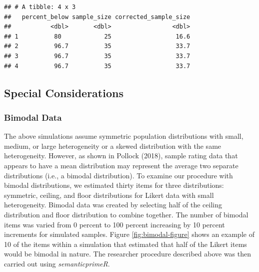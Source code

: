\documentclass[
  man]{apa7}
\newenvironment{Shaded}{\begin{snugshade}}{\end{snugshade}}
\newcommand{\AttributeTok}[1]{\textcolor[rgb]{0.13,0.29,0.53}{#1}}
\newcommand{\CommentTok}[1]{\textcolor[rgb]{0.56,0.35,0.01}{\textit{#1}}}
\newcommand{\DecValTok}[1]{\textcolor[rgb]{0.00,0.00,0.81}{#1}}
\newcommand{\FunctionTok}[1]{\textcolor[rgb]{0.13,0.29,0.53}{\textbf{#1}}}
\newcommand{\NormalTok}[1]{#1}
\newcommand{\OtherTok}[1]{\textcolor[rgb]{0.56,0.35,0.01}{#1}}
\newcommand{\SpecialCharTok}[1]{\textcolor[rgb]{0.81,0.36,0.00}{\textbf{#1}}}
\begin{document}
\begin{Shaded}
\end{Shaded}

\begin{verbatim}
## # A tibble: 4 x 3
##   percent_below sample_size corrected_sample_size
##           <dbl>       <dbl>                 <dbl>
## 1          80            25                  16.6
## 2          96.7          35                  33.7
## 3          96.7          35                  33.7
## 4          96.7          35                  33.7
\end{verbatim}

\subsection{Special Considerations}\label{special-considerations}

\subsubsection{Bimodal Data}\label{bimodal-data}

The above simulations assume symmetric population distributions with small, medium, or large heterogeneity or a skewed distribution with the same heterogeneity. However, as shown in Pollock (2018), sample rating data that appears to have a mean distribution may represent the average two separate distributions (i.e., a bimodal distribution). To examine our procedure with bimodal distributions, we estimated thirty items for three distributions: symmetric, ceiling, and floor distributions for Likert data with small heterogeneity. Bimodal data was created by selecting half of the ceiling distribution and floor distribution to combine together. The number of bimodal items was varied from 0 percent to 100 percent increasing by 10 percent increments for simulated samples. Figure \ref{fig:bimodal-figure} shows an example of 10 of the items within a simulation that estimated that half of the Likert items would be bimodal in nature. The researcher procedure described above was then carried out using \emph{semanticprimeR}.
\end{document}
